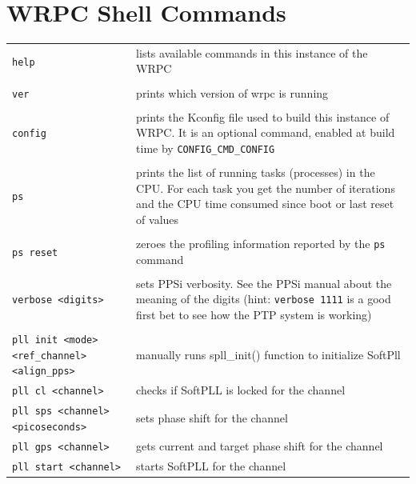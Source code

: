\documentclass[a4paper, 12pt]{article}
\newcommand{\code}[1]{\texttt{#1}}
\newcommand{\codeHook}[1]{\mbox{\ttfamily\MakeTextUppercase{#1}}}
\begin{document}


\appendix
\clearpage
\section{WRPC Shell Commands}
\label{WRPC Shell commands}

\footnotesize
\begin{longtable}{  p{7.5cm}  p{7cm} }

  \code{help} & lists available commands in this instance of the \codeHook{wrpc} \\
 & \\
  \code{ver} & prints which version of wrpc is running \\
 & \\
  \code{config} & prints the Kconfig file used to build this instance of
\codeHook{wrpc}. It is an optional command, enabled at build time by
\texttt{CONFIG\_CMD\_CONFIG} \\
 & \\
  \code{ps} & prints the list of running tasks (processes) in the CPU.
For each task you get the number of iterations and the CPU time consumed
since boot or last reset of values\\
 & \\
  \code{ps reset} & zeroes the profiling information reported by
the \code{ps} command\\
 & \\
  \code{verbose <digits>} & sets PPSi verbosity. See the PPSi manual
about the meaning of the digits (hint: \texttt{verbose 1111} is a good first bet to
see how the \codeHook{ptp} system is working) \\
 & \\
  \code{pll init <mode> <ref\_channel> <align\_pps>} & manually runs
spll\_init() function to initialize SoftPll \\

  \code{pll cl <channel>} & checks if SoftPLL is locked for the channel\\

  \code{pll sps <channel> <picoseconds>} & sets phase shift for the channel\\

  \code{pll gps <channel>} & gets current and target phase shift for the channel\\

  \code{pll start <channel>} & starts SoftPLL for the channel\\


\end{longtable}
\end{document}
